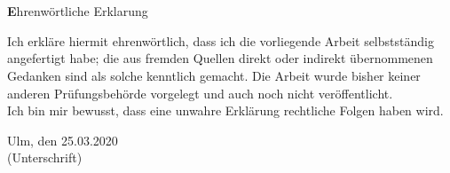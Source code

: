 \thispagestyle{empty}

\chapter*{}
\begin{center}
{\large\textbf Ehrenwörtliche Erklarung}
\end{center}

\vspace*{1cm}

\noindent
Ich erkläre hiermit ehrenwörtlich, dass ich die vorliegende Arbeit
selbstständig angefertigt habe; die aus fremden Quellen direkt oder indirekt 
übernommenen Gedanken sind als solche kenntlich gemacht. Die Arbeit wurde 
bisher keiner anderen Prüfungsbehörde vorgelegt und auch noch nicht 
veröffentlicht.\\

\noindent
Ich bin mir bewusst, dass eine unwahre Erklärung rechtliche Folgen haben wird.

\vspace{2cm}



\noindent Ulm, den 25.03.2020 \hspace{4cm}\hrulefill\\
\vspace*{0.5cm}
\hspace*{11.0cm} (Unterschrift)



